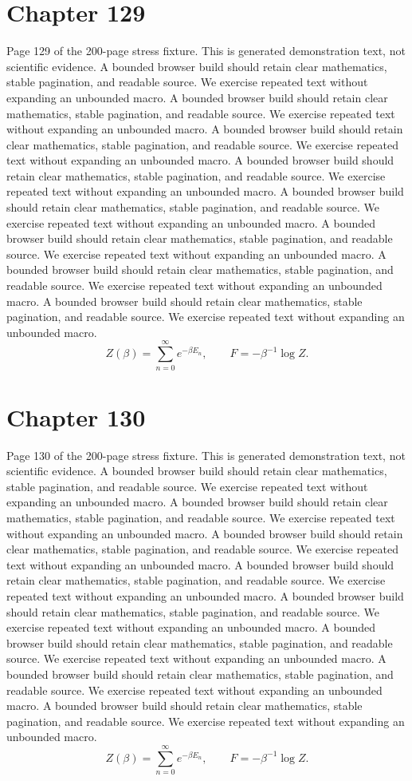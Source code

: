 \documentclass[11pt]{article}
\begin{document}
\section*{Chapter 129}
Page 129 of the 200-page stress fixture. This is generated demonstration text, not scientific evidence.
A bounded browser build should retain clear mathematics, stable pagination, and readable source. We exercise repeated text without expanding an unbounded macro.
A bounded browser build should retain clear mathematics, stable pagination, and readable source. We exercise repeated text without expanding an unbounded macro.
A bounded browser build should retain clear mathematics, stable pagination, and readable source. We exercise repeated text without expanding an unbounded macro.
A bounded browser build should retain clear mathematics, stable pagination, and readable source. We exercise repeated text without expanding an unbounded macro.
A bounded browser build should retain clear mathematics, stable pagination, and readable source. We exercise repeated text without expanding an unbounded macro.
A bounded browser build should retain clear mathematics, stable pagination, and readable source. We exercise repeated text without expanding an unbounded macro.
A bounded browser build should retain clear mathematics, stable pagination, and readable source. We exercise repeated text without expanding an unbounded macro.
A bounded browser build should retain clear mathematics, stable pagination, and readable source. We exercise repeated text without expanding an unbounded macro.
\[Z(\beta)=\sum_{n=0}^{\infty}e^{-\beta E_n},\qquad F=-\beta^{-1}\log Z.\]
\newpage
\section*{Chapter 130}
Page 130 of the 200-page stress fixture. This is generated demonstration text, not scientific evidence.
A bounded browser build should retain clear mathematics, stable pagination, and readable source. We exercise repeated text without expanding an unbounded macro.
A bounded browser build should retain clear mathematics, stable pagination, and readable source. We exercise repeated text without expanding an unbounded macro.
A bounded browser build should retain clear mathematics, stable pagination, and readable source. We exercise repeated text without expanding an unbounded macro.
A bounded browser build should retain clear mathematics, stable pagination, and readable source. We exercise repeated text without expanding an unbounded macro.
A bounded browser build should retain clear mathematics, stable pagination, and readable source. We exercise repeated text without expanding an unbounded macro.
A bounded browser build should retain clear mathematics, stable pagination, and readable source. We exercise repeated text without expanding an unbounded macro.
A bounded browser build should retain clear mathematics, stable pagination, and readable source. We exercise repeated text without expanding an unbounded macro.
A bounded browser build should retain clear mathematics, stable pagination, and readable source. We exercise repeated text without expanding an unbounded macro.
\[Z(\beta)=\sum_{n=0}^{\infty}e^{-\beta E_n},\qquad F=-\beta^{-1}\log Z.\]
\newpage
\end{document}
